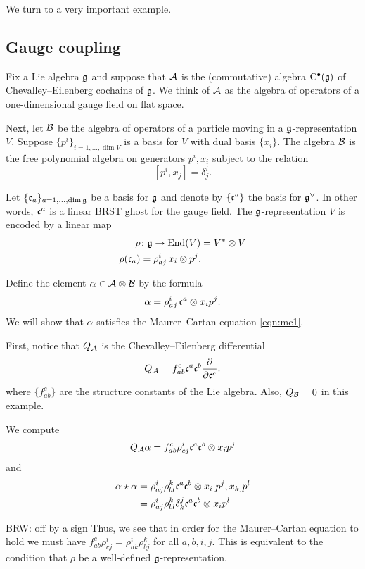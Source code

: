 \documentclass[11pt]{amsart}
\def\brian#1{{\textcolor{blue!65!red}{BRW: {#1}}}}
\begin{document}
We turn to a very important example. 

\subsection{Gauge coupling} \label{sec:gauge}

Fix a Lie algebra $\mathfrak g$ and
suppose that $\mathcal A$ is the (commutative) algebra ${\rm C}^\bullet(\mathfrak g)$ of Chevalley--Eilenberg cochains of $\mathfrak g$. 
We think of $\mathcal A$ as the algebra of operators of a one-dimensional gauge field on flat space. 

Next, let $\mathcal B$ be the algebra of operators of a particle moving in a $\mathfrak g$-representation $V$.
Suppose $\{p^i\}_{i=1,\ldots,\dim V}$ is a basis for $V$ with dual basis $\{x_i\}$. 
The algebra $\mathcal B$ is the free polynomial algebra on generators $p^i, x_i$ subject to the relation 
\[
[p^i, x_j] = \delta_j^i .
\]

Let $\{\mathfrak c_a\}_{a=1,\dots,\dim \mathfrak g}$ be a basis for $\mathfrak g$ and denote by $\{\mathfrak c^a\}$ the basis for $\mathfrak g^\vee$. 
In other words, $\mathfrak c^a$ is a linear BRST ghost for the gauge field. 
The $\mathfrak g$-representation $V$ is encoded by a linear map 
\begin{align*}
\rho & \colon \mathfrak g \to {\rm End}(V) = V^* \otimes V \\
\rho(\mathfrak c_a) & = \rho_{aj}^i \, x_i \otimes p^j .
\end{align*}

Define the element $\alpha \in \mathcal A \otimes \mathcal B$ by the formula
\[
\alpha = \rho_{aj}^i \, \mathfrak c^a \otimes x_i p^j .
\]
We will show that $\alpha$ satisfies the Maurer--Cartan equation \eqref{eqn:mc1}. 

First, notice that $Q_{\mathcal A}$ is the Chevalley--Eilenberg differential 
\[
Q_{\mathcal A} = f_{ab}^c \mathfrak c^a \mathfrak c^b \frac{\partial}{\partial \mathfrak c^c} .
\]
where $\{f_{ab}^c\}$ are the structure constants of the Lie algebra. 
Also, $Q_{\mathcal B} = 0$ in this example. 

We compute
\[
Q_{\mathcal A} \alpha = f_{ab}^c \rho_{cj}^i \mathfrak c^a \mathfrak c^b \otimes x_i p^j 
\]
and
\begin{align*}
\alpha \star \alpha & = \rho_{aj}^i \rho_{bl}^k \mathfrak c^a \mathfrak c^b \otimes x_i [p^j, x_k] p^l \\
& = \rho_{aj}^i \rho_{bl}^k \delta^j_k \mathfrak c^a \mathfrak c^b \otimes x_i p^l 
\end{align*}

\brian{off by a sign}
Thus, we see that in order for the Maurer--Cartan equation to hold we must have $f_{ab}^c \rho_{cj}^i = \rho^i_{ak} \rho^k_{bj}$ for all $a,b,i,j$. 
This is equivalent to the condition that $\rho$ be a well-defined $\mathfrak g$-representation. 
\end{document}
